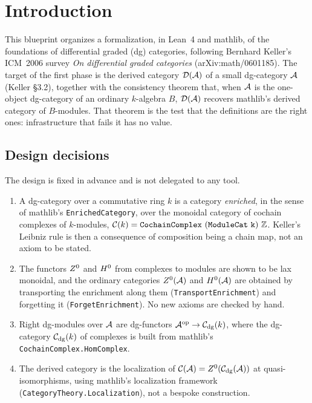 \chapter{Introduction}
\label{ch:intro}

This blueprint organizes a formalization, in Lean~4 and mathlib, of the foundations of
differential graded (dg) categories, following Bernhard Keller's ICM~2006 survey
\emph{On differential graded categories} (arXiv:math/0601185). The target of the
first phase is the derived category $\mathcal{D}(\mathcal{A})$ of a small dg-category $\mathcal{A}$
(Keller \S 3.2), together with the consistency theorem that, when $\mathcal{A}$ is the
one-object dg-category of an ordinary $k$-algebra $B$, $\mathcal{D}(\mathcal{A})$ recovers mathlib's
derived category of $B$-modules. That theorem is the test that the definitions are the
right ones: infrastructure that fails it has no value.

\section*{Design decisions}

The design is fixed in advance and is not delegated to any tool.

\begin{enumerate}
\item A dg-category over a commutative ring $k$ is a category \emph{enriched}, in the
  sense of mathlib's \texttt{EnrichedCategory}, over the monoidal category of cochain
  complexes of $k$-modules, $\Ch(k) = \mathtt{CochainComplex\ (ModuleCat\ k)\ }\mathbb{Z}$.
  Keller's Leibniz rule is then a consequence of composition being a chain map, not an
  axiom to be stated.
\item The functors $Z^0$ and $H^0$ from complexes to modules are shown to be lax monoidal,
  and the ordinary categories $Z^0(\mathcal{A})$ and $H^0(\mathcal{A})$ are obtained by transporting the
  enrichment along them (\texttt{TransportEnrichment}) and forgetting it
  (\texttt{ForgetEnrichment}). No new axioms are checked by hand.
\item Right dg-modules over $\mathcal{A}$ are dg-functors $\mathcal{A}^{\mathrm{op}} \to \mathcal{C}_{\mathrm{dg}}(k)$, where the
  dg-category $\mathcal{C}_{\mathrm{dg}}(k)$ of complexes is built from mathlib's \texttt{CochainComplex.HomComplex}.
\item The derived category is the localization of $\mathcal{C}(\mathcal{A}) = Z^0(\mathcal{C}_{\mathrm{dg}}(\mathcal{A}))$ at
  quasi-isomorphisms, using mathlib's localization framework
  (\texttt{CategoryTheory.Localization}), not a bespoke construction.
\end{enumerate}

